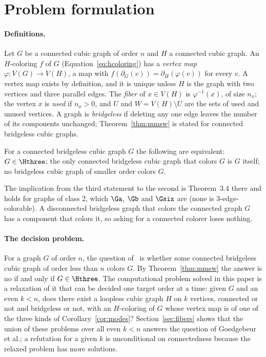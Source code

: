 \section{Problem formulation}\label{sec:problem}

\paragraph{Definitions.} Let $G$ be a connected cubic graph of order $n$ and $H$ a connected cubic graph.
An $H$-coloring $f$ of $G$ (Equation~\eqref{eq:hcoloring}) has a \emph{vertex map} $\varphi : V(G) \to V(H)$,
a map with $f(\partial_G(v)) = \partial_H(\varphi(v))$ for every $v$. A vertex map exists by definition, and it is
unique unless $H$ is the graph with two vertices and three parallel edges. The \emph{fiber} of $x \in V(H)$
is $\varphi^{-1}(x)$, of size $n_x$; the vertex $x$ is \emph{used} if $n_x > 0$, and $U$ and $W = V(H) \setminus U$
are the sets of used and unused vertices. A graph is \emph{bridgeless} if deleting any one edge leaves the number of its components unchanged;
Theorem~\ref{thm:mmsw} is stated for connected bridgeless cubic graphs.

\begin{theorem}[\cite{MMSW2025}, Theorem~3.7, case $r = 3$; \evV]\label{thm:mmsw}
For a connected bridgeless cubic graph $G$ the following are equivalent: $G \in \Hthree$; the only
connected bridgeless cubic graph that colors $G$ is $G$ itself; no bridgeless cubic graph of
smaller order colors $G$.
\end{theorem}

The implication from the third statement to the second is Theorem~3.4 there and holds for graphs of class 2, which $\Ga$, $\Gb$ and $\Gsix$ are (none is 3-edge-colorable). A disconnected bridgeless graph that colors the connected graph $G$ has a component that colors it, so asking for a connected colorer loses nothing.

\paragraph{The decision problem.} For a graph $G$ of order $n$, the question of~\cite[Section~5.4]{GJMMMU2026} is
whether some connected bridgeless cubic graph of order less than $n$ colors $G$. By Theorem~\ref{thm:mmsw} the answer is no
if and only if $G \in \Hthree$. The computational problem solved in this paper is a relaxation of it that
can be decided one target order at a time: given $G$ and an even $k < n$, does there exist a loopless cubic graph $H$
on $k$ vertices, connected or not and bridgeless or not, with an $H$-coloring of $G$ whose vertex map is of one of the
three kinds of Corollary~\ref{cor:modes}? Section~\ref{sec:fibers} shows that the union of these problems over all even
$k < n$ answers the question of Goedgebeur et al.; a refutation for a given $k$ is unconditional on connectedness
because the relaxed problem has more solutions.


